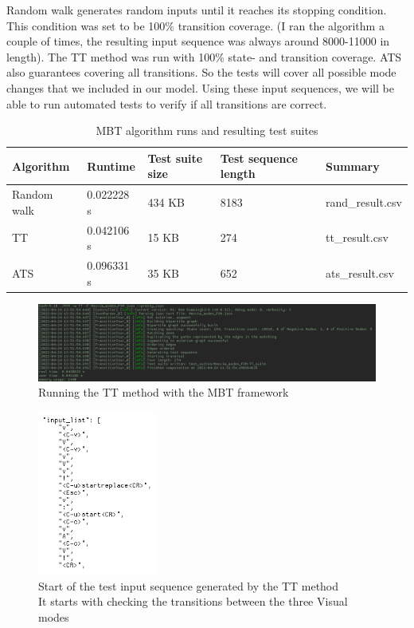 \documentclass[12pt]{article}
\begin{document}
		Random walk generates random inputs until it reaches its stopping condition. This condition was set to be 100\% transition coverage. (I ran the algorithm a couple of times, the resulting input sequence was always around 8000-11000 in length). The TT method was run with 100\% state- and transition coverage. ATS also guarantees covering all transitions. So the tests will cover all possible mode changes that we included in our model. Using these input sequences, we will be able to run automated tests to verify if all transitions are correct.

		\begin{table}[h!]
		\begin{center}
			\begin{tabular}{l|l|l|p{30mm}|l}
			\textbf{Algorithm} & \textbf{Runtime} & \textbf{Test suite size} & \textbf{Test sequence length} & \textbf{Summary}\\
			\hline
			Random walk & 0.022228 s & 434 KB & 8183 & rand\_result.csv\\
			\hline
			TT & 0.042106 s & 15 KB & 274 & tt\_result.csv\\
			\hline
			ATS & 0.096331 s & 35 KB & 652 & ats\_result.csv\\
			\hline
		\end{tabular}
		\caption{MBT algorithm runs and resulting test suites}
		\end{center}
		\end{table}

		\begin{figure}[!h]
			\centering
			\includegraphics[width=1.0\textwidth]{images/TT_run.png}
			\caption{Running the TT method with the MBT framework}
		\end{figure}

		\begin{figure}[!h]
			\centering
			\includegraphics[width=0.35\textwidth]{images/test_input_sequence.png}
			\caption{Start of the test input sequence generated by the TT method\\It starts with checking the transitions between the three Visual modes}
		\end{figure}
\end{document}
